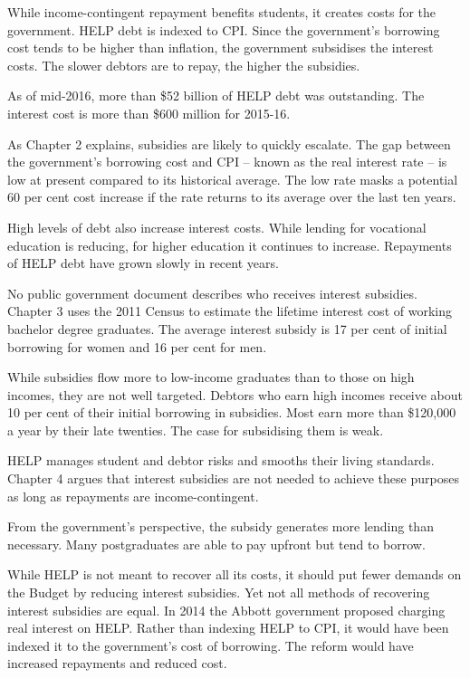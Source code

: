 \documentclass[]{book}
\begin{document}
While income-contingent repayment benefits students, it creates costs for the government. HELP debt is indexed to CPI. Since the government's borrowing cost tends to be higher than inflation, the government subsidises the interest costs. The slower debtors are to repay, the higher the subsidies.

As of mid-2016, more than \$52 billion of HELP debt was outstanding. The interest cost is more than \$600 million for 2015-16.

As Chapter 2 explains, subsidies are likely to quickly escalate. The gap between the government's borrowing cost and CPI -- known as the real interest rate -- is low at present compared to its historical average. The low rate masks a potential 60 per cent cost increase if the rate returns to its average over the last ten years.

High levels of debt also increase interest costs. While lending for vocational education is reducing, for higher education it continues to increase. Repayments of HELP debt have grown slowly in recent years.

No public government document describes who receives interest subsidies. Chapter 3 uses the 2011 Census to estimate the lifetime interest cost of working bachelor degree graduates. The average interest subsidy is 17 per cent of initial borrowing for women and 16 per cent for men.

While subsidies flow more to low-income graduates than to those on high incomes, they are not well targeted. Debtors who earn high incomes receive about 10 per cent of their initial borrowing in subsidies. Most earn more than \$120,000 a year by their late twenties. The case for subsidising them is weak.

HELP manages student and debtor risks and smooths their living standards. Chapter 4 argues that interest subsidies are not needed to achieve these purposes as long as repayments are income-contingent.

From the government's perspective, the subsidy generates more lending than necessary. Many postgraduates are able to pay upfront but tend to borrow.

While HELP is not meant to recover all its costs, it should put fewer demands on the Budget by reducing interest subsidies. Yet not all methods of recovering interest subsidies are equal. In 2014 the Abbott government proposed charging real interest on HELP. Rather than indexing HELP to CPI, it would have been indexed it to the government's cost of borrowing. The reform would have increased repayments and reduced cost.
\end{document}
